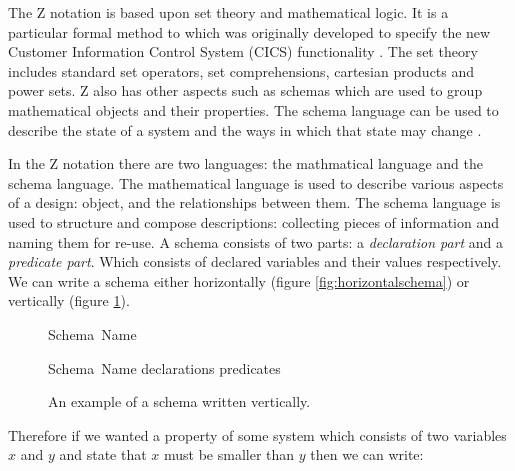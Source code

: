The Z notation is based upon set theory and mathematical logic. It is a particular formal method to which was originally developed to specify the new Customer Information Control System (CICS) functionality \cite{cics}. The set theory includes standard set operators, set comprehensions, cartesian products and power sets. Z also has other aspects such as schemas which are used to group mathematical objects and their properties. The schema language can be used to describe the state of a system and the ways in which that state may change \cite{Woodcock:1996:UZS:235337}.

In the Z notation there are two languages: the mathmatical language and the schema language. The mathematical language is used to describe various aspects of a design: object, and the relationships between them. The schema language is used to structure and compose descriptions: collecting pieces of information and naming them for re-use. A schema consists of two parts: a \emph{declaration part} and a \emph{predicate part}. Which consists of declared variables and their values respectively. We can write a schema either horizontally (figure \ref{fig:horizontalschema}) or vertically (figure \ref{fig:verticalschema}).

\begin{figure}[H]
\vspace{-0.2in}
\centering
\begin{minipage}{0.45\textwidth}
\begin{zed}
Schema\ Name 
\end{zed}
\vspace{-0.18in}
\caption{An example of a schema written horizontally.\label{fig:horizontalschema}}
\vspace{-0.2in}
\end{minipage}\hfill
\begin{minipage}{0.45\textwidth}
\begin{schema}{Schema\ Name}
declarations
\where
predicates
\end{schema}
\vspace{-0.2in}
\caption{An example of a schema written vertically. \label{fig:verticalschema}}
\vspace{-0.2in}
\end{minipage}
\end{figure}

Therefore if we wanted a property of some system which consists of two variables $x$ and $y$ and state that $x$ must be smaller than $y$ then we can write:

